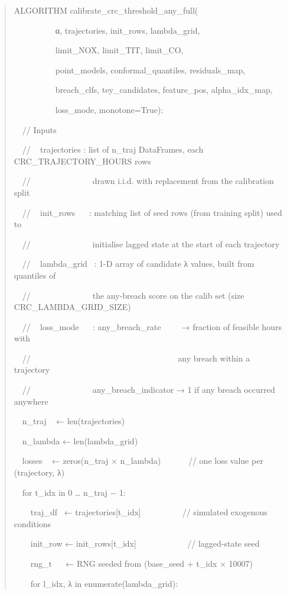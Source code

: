 \documentclass[11pt]{article}
\begin{document}
\begin{quote}
ALGORITHM calibrate\_crc\_threshold\_any\_full(

~~~~~~~~~~α, trajectories, init\_rows, lambda\_grid,

~~~~~~~~~~limit\_NOX, limit\_TIT, limit\_CO,

~~~~~~~~~~point\_models, conformal\_quantiles, residuals\_map,

~~~~~~~~~~breach\_clfs, tey\_candidates, feature\_pos, alpha\_idx\_map,

~~~~~~~~~~loss\_mode, monotone=True):

~~// Inputs

~~// ~ trajectories : list of n\_traj DataFrames, each
CRC\_TRAJECTORY\_HOURS rows

~~//~ ~ ~ ~ ~ ~ ~ ~ ~ drawn i.i.d. with replacement from the calibration
split

~~// ~ init\_rows~ ~ : matching list of seed rows (from training split)
used to

~~//~ ~ ~ ~ ~ ~ ~ ~ ~ initialise lagged state at the start of each
trajectory

~~// ~ lambda\_grid~ : 1-D array of candidate λ values, built from
quantiles of

~~//~ ~ ~ ~ ~ ~ ~ ~ ~ the any-breach score on the calib set (size
CRC\_LAMBDA\_GRID\_SIZE)

~~// ~ loss\_mode~ ~ :
\textquotesingle any\_breach\_rate\textquotesingle~ ~ ~ → fraction of
feasible hours with

~~// ~ ~ ~ ~ ~ ~ ~ ~ ~ ~ ~ ~ ~ ~ ~ ~ ~ ~ ~ ~ ~ any breach within a
trajectory

~~//~ ~ ~ ~ ~ ~ ~ ~ ~
\textquotesingle any\_breach\_indicator\textquotesingle{} → 1 if any
breach occurred anywhere

~~n\_traj ~ ← len(trajectories)

~~n\_lambda ← len(lambda\_grid)

~~losses ~ ← zeros(n\_traj × n\_lambda)~ ~ ~ ~ // one loss value per
(trajectory, λ)

~~for t\_idx in 0 \ldots{} n\_traj − 1:

~~~~traj\_df~ ← trajectories{[}t\_idx{]}~ ~ ~ ~ ~ ~ // simulated
exogenous conditions

~~~~init\_row ← init\_rows{[}t\_idx{]} ~ ~ ~ ~ ~ ~ ~ // lagged-state
seed

~~~~rng\_t~ ~ ← RNG seeded from (base\_seed + t\_idx × 10007)

~~~~for l\_idx, λ in enumerate(lambda\_grid):


\end{quote}
\end{document}
